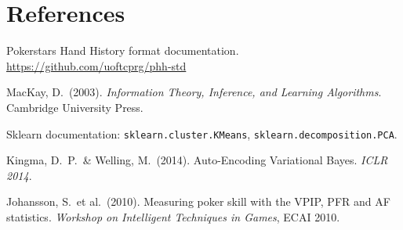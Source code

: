 \documentclass{article}
\begin{document}
\section*{References}
\begin{enumerate}[label={[\arabic*]},noitemsep]
  \item Pokerstars Hand History format documentation.
        \url{https://github.com/uoftcprg/phh-std}
  \item MacKay, D.\ (2003). \textit{Information Theory, Inference, and Learning
        Algorithms}. Cambridge University Press.
  \item Sklearn documentation: \texttt{sklearn.cluster.KMeans},
        \texttt{sklearn.decomposition.PCA}.
  \item Kingma, D.\ P.\ \& Welling, M.\ (2014). Auto-Encoding Variational Bayes.
        \textit{ICLR 2014}.
  \item Johansson, S.\ et al.\ (2010). Measuring poker skill with the VPIP,
        PFR and AF statistics. \textit{Workshop on Intelligent Techniques in Games},
        ECAI 2010.
\end{enumerate}
\end{document}
